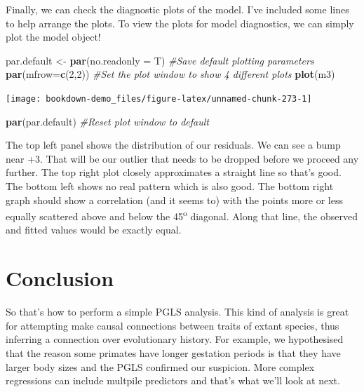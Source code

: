 \documentclass[
]{book}
\newenvironment{Shaded}{\begin{snugshade}}{\end{snugshade}}
\newcommand{\CommentTok}[1]{\textcolor[rgb]{0.56,0.35,0.01}{\textit{#1}}}
\newcommand{\DataTypeTok}[1]{\textcolor[rgb]{0.13,0.29,0.53}{#1}}
\newcommand{\DecValTok}[1]{\textcolor[rgb]{0.00,0.00,0.81}{#1}}
\newcommand{\KeywordTok}[1]{\textcolor[rgb]{0.13,0.29,0.53}{\textbf{#1}}}
\newcommand{\NormalTok}[1]{#1}
\newcommand{\StringTok}[1]{\textcolor[rgb]{0.31,0.60,0.02}{#1}}
\begin{document}
Finally, we can check the diagnostic plots of the model. I've included some lines to help arrange the plots. To view the plots for model diagnostics, we can simply plot the model object!

\begin{Shaded}
\begin{Highlighting}[]
\NormalTok{par.default \textless{}{-}}\StringTok{ }\KeywordTok{par}\NormalTok{(}\DataTypeTok{no.readonly =}\NormalTok{ T) }\CommentTok{\#Save default plotting parameters}
\KeywordTok{par}\NormalTok{(}\DataTypeTok{mfrow=}\KeywordTok{c}\NormalTok{(}\DecValTok{2}\NormalTok{,}\DecValTok{2}\NormalTok{)) }\CommentTok{\#Set the plot window to show 4 different plots}
\KeywordTok{plot}\NormalTok{(m3)}
\end{Highlighting}
\end{Shaded}

\begin{center}\texttt{[image: bookdown-demo\_files/figure-latex/unnamed-chunk-273-1]} \end{center}

\begin{Shaded}
\begin{Highlighting}[]
\KeywordTok{par}\NormalTok{(par.default) }\CommentTok{\#Reset plot window to default}
\end{Highlighting}
\end{Shaded}

The top left panel shows the distribution of our residuals. We can see a bump near +3. That will be our outlier that needs to be dropped before we proceed any further. The top right plot closely approximates a straight line so that's good. The bottom left shows no real pattern which is also good. The bottom right graph should show a correlation (and it seems to) with the points more or less equally scattered above and below the 45\textsuperscript{o} diagonal. Along that line, the observed and fitted values would be exactly equal.

\hypertarget{conclusion}{%
\section{Conclusion}\label{conclusion}}

So that's how to perform a simple PGLS analysis. This kind of analysis is great for attempting make causal connections between traits of extant species, thus inferring a connection over evolutionary history. For example, we hypothesised that the reason some primates have longer gestation periods is that they have larger body sizes and the PGLS confirmed our suspicion. More complex regressions can include multpile predictors and that's what we'll look at next.
\end{document}
